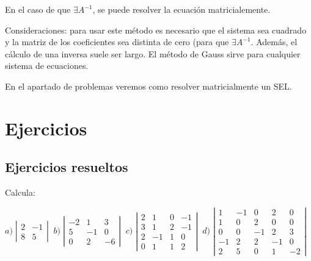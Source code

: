 \normalsize{En} el caso de que $\exists A^{-1}$, se puede resolver la ecuación matricialemente.

Consideraciones: para usar este método es necesario que el sistema sea cuadrado y la matriz de los coeficientes sea distinta de cero (para que $\exists A^{-1}$. Además, el cálculo de una inversa suele ser largo. El método de Gauss sirve para cualquier sistema de ecuaciones.

En el apartado de problemas veremos como resolver matricialmente un SEL.



\section{Ejercicios}

\subsection{Ejercicios resueltos}


\begin{ejre} Calcula:

\noindent \small{$a)\; \left| \begin{matrix} 2&-1\\8&5  \end{matrix} \right| \; \;    
b)\; \left| \begin{matrix} -2&1&3\\5&-1&0\\0&2&-6  \end{matrix} \right| \; \; 
c)\; \left| \begin{matrix} 2&1&0&-1\\3&1&2&-1\\2&-1&1&0\\0&1&1&2  \end{matrix} \right| \; \; 
d)\; \left| \begin{matrix} 1&-1&0&2&0\\1&0&2&0&0\\0&0&-1&2&3\\-1&2&2&-1&0\\2&5&0&1&-2   \end{matrix} \right| \; \; $}

\end{ejre}

